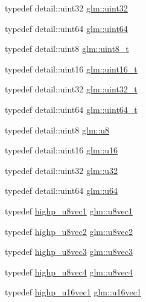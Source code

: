 \begin{DoxyCompactItemize}
typedef detail\+::uint32 \hyperlink{group__gtc__type__precision_ga202b6a53c105fcb7e531f9b443518451}{glm\+::uint32}
\item 
typedef detail\+::uint64 \hyperlink{group__gtc__type__precision_gae3632bf9b37da66233d78930dd06378a}{glm\+::uint64}
\item 
typedef detail\+::uint8 \hyperlink{group__gtc__type__precision_ga93adf6dd9803408f3e3aaf9dedda352b}{glm\+::uint8\+\_\+t}
\item 
typedef detail\+::uint16 \hyperlink{group__gtc__type__precision_gac4eb4f43cae8129b00086dc234d3b8fc}{glm\+::uint16\+\_\+t}
\item 
typedef detail\+::uint32 \hyperlink{group__gtc__type__precision_ga822ca53a9ad412504532838906276a99}{glm\+::uint32\+\_\+t}
\item 
typedef detail\+::uint64 \hyperlink{group__gtc__type__precision_ga058f57c19e1befdcf12498944bd73e69}{glm\+::uint64\+\_\+t}
\item 
typedef detail\+::uint8 \hyperlink{group__gtc__type__precision_ga5e3dc67373d5068997d2d9f41c9024d2}{glm\+::u8}
\item 
typedef detail\+::uint16 \hyperlink{group__gtc__type__precision_gae7a1571503f83d2264ddfa705a6b082a}{glm\+::u16}
\item 
typedef detail\+::uint32 \hyperlink{group__gtc__type__precision_ga54e837745059fd29017bed71cfa0a8db}{glm\+::u32}
\item 
typedef detail\+::uint64 \hyperlink{group__gtc__type__precision_ga71cedd4972f9cb1a5e14dfe5ab83ecd7}{glm\+::u64}
\item 
typedef \hyperlink{fwd_8hpp_a5fb26037ebac53e4565ee4227fa07df5}{highp\+\_\+u8vec1} \hyperlink{group__gtc__type__precision_ga5b0875b5979b80a0ccb371bf7f0f95d8}{glm\+::u8vec1}
\item 
typedef \hyperlink{fwd_8hpp_a6cd397d267dd6896c0b661c0fc887e68}{highp\+\_\+u8vec2} \hyperlink{group__gtc__type__precision_ga01e28d0272428f94d22ea6111f0112be}{glm\+::u8vec2}
\item 
typedef \hyperlink{fwd_8hpp_a503995bc0d44e9a54d3970b4fedcbc2e}{highp\+\_\+u8vec3} \hyperlink{group__gtc__type__precision_gaa86b325e581afdc643495fbe428c1f1b}{glm\+::u8vec3}
\item 
typedef \hyperlink{fwd_8hpp_aaf1f8decf9eb0613ef7749f3ec8a9a85}{highp\+\_\+u8vec4} \hyperlink{group__gtc__type__precision_ga6c8841fa492bd5b1078b171452fd6974}{glm\+::u8vec4}
\item 
typedef \hyperlink{fwd_8hpp_a187d708c2482ac0d234f68fd71f4ef25}{highp\+\_\+u16vec1} \hyperlink{group__gtc__type__precision_ga40d9e5ab8120f10efcfd7c88436c4a81}{glm\+::u16vec1}

\end{DoxyCompactItemize}
